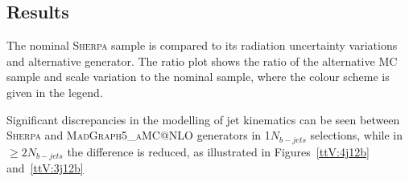 \subsection{Results}

The nominal  \textsc{Sherpa} \ttW  sample is compared to its radiation uncertainty variations and alternative generator.
The ratio plot shows the ratio of the alternative MC sample and scale variation to the nominal sample, where the colour scheme is given in the legend.

Significant discrepancies in the modelling of jet kinematics can be seen between \textsc{Sherpa} \ttW and \textsc{MadGraph5\_aMC@NLO} generators in 1$N_{b-jets}$ selections, while in $\geq2$$N_{b-jets}$ the difference is reduced, as illustrated in Figures~\ref{ttV:4j12b} and~\ref{ttV:3j12b}

